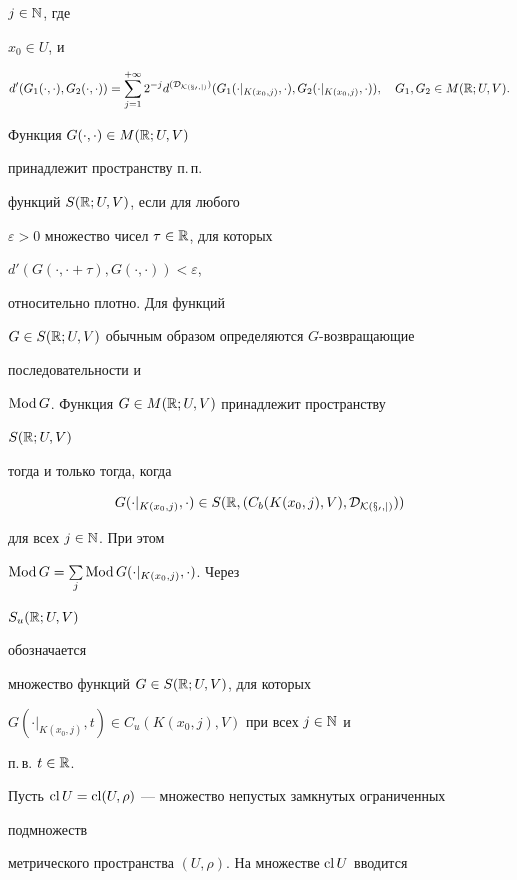 $j\in\Bbb N$, где


$x_0\in U$, и


$$


d'(G_1(\cdot,\cdot),G_2(\cdot,\cdot))=


\sum^{+\infty}_{j=1}2^{-j}d^{(\cal D_{K(x_0,j)})}


(G_1(\cdot|_{K(x_0,j)},\cdot),G_2(\cdot|_{K(x_0,j)},\cdot)),


\quad G_1,G_2\in M(\Bbb R;U,V).


$$


Функция $G(\cdot,\cdot)\in M(\Bbb R;U,V)$


принадлежит пространству п.\,п.


функций $S(\Bbb R;U,V)$, если для любого


$\varepsilon>0$ множество чисел $\tau\in\Bbb R$, для которых


$d'(G(\cdot,\cdot+\tau),G(\cdot,\cdot))<\varepsilon$,


относительно плотно. Для функций


$G\in S(\Bbb R;U,V)$ обычным образом определяются $G$-возвращающие


последовательности и


$\operatorname{Mod} G$. Функция $G\in M(\Bbb R;U,V)$ принадлежит пространству


$S(\Bbb R;U,V)$


тогда и только тогда, когда


$$


G(\cdot|_{K(x_0,j)},\cdot)\in S(\Bbb R,(C_b(K(x_0,j),V),


\cal D_{K(x_0,j)}))


$$


для всех $j\in\Bbb N$. При этом


$\operatorname{Mod} G=\sum\limits_j\operatorname{Mod} G(\cdot|_{K(x_0,j)},\cdot)$. Через


$S_u(\Bbb R;U,V)$


обозначается


множество функций $G\in S(\Bbb R;U,V)$, для которых


$G(\cdot|_{K(x_0,j)},t)\in C_u(K(x_0,j),V)$ при всех $j\in\Bbb N$ и


п.\,в. $t\in\Bbb R$.





Пусть $\operatorname{cl} U=\operatorname{cl}(U,\rho)$ --- множество непустых замкнутых ограниченных


подмножеств


метрического пространства $(U,\rho)$. На множестве $\operatorname{cl} U$ вводится


